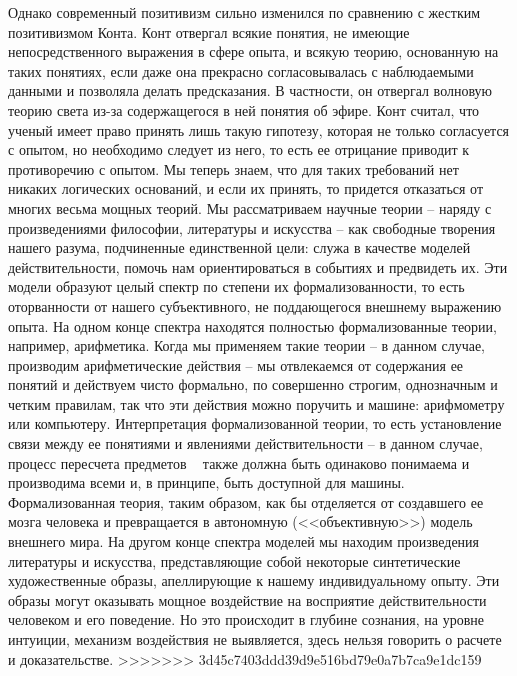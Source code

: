 \documentclass{book}
\begin{document}
Однако современный позитивизм сильно изменился по срав­нению с жестким позитивизмом Конта. Конт отвергал всякие понятия, не имеющие непосредственного выражения в сфере опыта, и всякую теорию, основанную на таких понятиях, если даже она прекрасно согласовывалась с наблюдаемыми данными и позволяла делать предсказания. В частности, он отвергал волновую теорию света из-за содержащегося в ней понятия об эфире. Конт считал, что ученый имеет право принять лишь такую гипотезу, которая не только согласуется с опытом, но необходимо следует из него, то есть ее отрицание приводит к противоречию с опытом. Мы теперь знаем, что для таких требований нет никаких логических оснований, и если их принять, то придется отказаться от многих весьма мощных теорий. Мы рассматриваем научные теории -- наряду с произведениями философии, литературы и искусства -- как свободные творения нашего ра­зума, подчиненные единственной цели: служа в качестве моделей действительности, помочь нам ориентироваться в событиях и предвидеть их. Эти 
модели образуют целый спектр по степени их формализованности,  то есть оторванности от нашего субъек­тивного, не поддающегося внешнему выражению опыта. На од­ном конце спектра находятся полностью формализованные теории, например, арифметика. Когда мы применяем такие теории -- в данном случае, производим арифметические действия -- мы отвлекаемся от содержания ее понятий и действуем чисто формально, по совершенно строгим, однозначным и четким правилам, так что эти действия можно поручить и машине: арифмометру или компьютеру. Интерпретация формализованной теории, то есть установление связи между ее понятиями и явлениями действительности -- в данном случае, процесс пересчета предметов ~ также должна быть одинаково понимаема и производима всеми и, в принципе, быть доступной для машины. Формализованная теория, таким образом, как бы отделяется от создавшего ее мозга человека и превращается в автономную (<<объективную>>) модель внешнего мира. На другом конце спектра моделей мы находим произведения литературы и 
ис­кусства, представляющие собой некоторые синтетические художественные образы, апеллирующие к нашему индивидуальному опыту. Эти образы могут оказывать мощное воздействие на восприятие действительности человеком и его поведение. Но это происходит в глубине сознания, на уровне интуиции, механизм воздействия не выявляется, здесь нельзя говорить о расчете и доказательстве.
>>>>>>> 3d45c7403ddd39d9e516bd79e0a7b7ca9e1dc159
\end{document}

